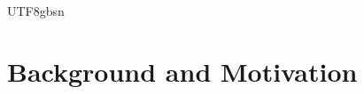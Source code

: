 \documentclass[journal]{IEEEtran}
\begin{document}
\begin{CJK*}{UTF8}{gbsn}
\section{Background and Motivation}
\label{sec:background}









\end{CJK*}
\end{document}
